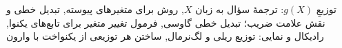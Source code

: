 \documentclass[a4paper,11pt,oneside,openany]{book}
\begin{document}
  {{توزیعِ $g(X)$: ترجمهٔ سؤال به زبان $X$},
   {روش  برای متغیرهای پیوسته},
   {تبدیل خطی و نقش علامت ضریب؛ تبدیل خطی گاوسی},
   {فرمول تغییر متغیر برای تابع‌های یکنوا},
   {رادیکال و نمایی: توزیع ریلی و لگ‌نرمال},
   {ساختن هر توزیعی از یکنواخت با  وارون}}

\mainmatter
\setcounter{chapter}{9}   %

\end{document}

